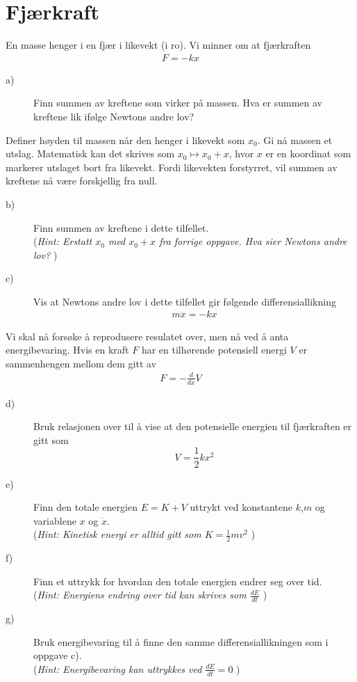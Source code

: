 \documentclass[a4paper, norsk, 12pt]{article}
\newcommand{\EQU}[1] { \begin{equation*} \begin{split}
#1  
\end{split} \end{equation*} }
\begin{document}
\section{Fjærkraft}
En masse henger i en fjær i likevekt (i ro). Vi minner om at fjærkraften
\EQU{
F=-kx
}
\begin{description}
\item[a)] Finn summen av kreftene som virker på massen. Hva er summen av kreftene lik ifølge Newtons andre lov?

\end{description}
Definer høyden til massen når den henger i likevekt som $x_0$. Gi nå massen et utslag. Matematisk kan det skrives som $x_0 \mapsto x_0 + x$, hvor $x$ er en koordinat som markerer utslaget bort fra likevekt. Fordi likevekten forstyrret, vil summen av kreftene nå være forskjellig fra null.
\begin{description}

\item[b)] Finn summen av kreftene i dette tilfellet. \\
({\it \footnotesize Hint: Erstatt $x_0$ med $x_0+x$ fra forrige oppgave. Hva sier Newtons andre lov? })

\item[c)] Vis at Newtons andre lov i dette tilfellet gir følgende differensiallikning
\EQU{
m\ddot{x}=-kx
}
\end{description}
Vi skal nå forsøke å reprodusere resulatet over, men nå ved å anta energibevaring. Hvis en kraft $F$ har en tilhørende potensiell energi $V$ er sammenhengen mellom dem gitt av 
\EQU{
F=-\frac{d}{dx}V
}
\begin{description}

\item[d)] Bruk relasjonen over til å vise at den potensielle energien til fjærkraften er gitt som 
\[V=\frac{1}{2}kx^2\]

\item[e)] Finn den totale energien $E=K+V$ uttrykt ved konstantene $k$,$m$ og variablene $x$ og $\dot{x}$. \\
({\it \footnotesize Hint: Kinetisk energi er alltid gitt som $K=\frac{1}{2}mv^2$  } )

\item[f)] Finn et uttrykk for hvordan den totale energien endrer seg over tid.\\
({\it \footnotesize Hint: Energiens endring over tid kan skrives som $\frac{dE}{dt}$  })

\item[g)] Bruk energibevaring til å finne den samme differensiallikningen som i oppgave c).\\
({\it \footnotesize Hint: Energibevaring kan uttrykkes ved $\frac{dE}{dt}=0$ })

\end{description}
\end{document}
